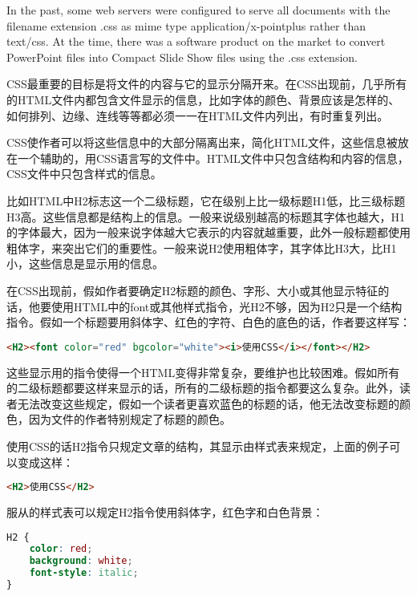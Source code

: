 In the past, some web servers were configured to serve all documents with the filename extension .css as mime type application/x-pointplus rather than text/css. At the time, there was a software product on the market to convert PowerPoint files into Compact Slide Show files using the .css extension.



CSS最重要的目标是将文件的内容与它的显示分隔开来。在CSS出现前，几乎所有的HTML文件内都包含文件显示的信息，比如字体的颜色、背景应该是怎样的、如何排列、边缘、连线等等都必须一一在HTML文件内列出，有时重复列出。

CSS使作者可以将这些信息中的大部分隔离出来，简化HTML文件，这些信息被放在一个辅助的，用CSS语言写的文件中。HTML文件中只包含结构和内容的信息，CSS文件中只包含样式的信息。

比如HTML中H2标志这一个二级标题，它在级别上比一级标题H1低，比三级标题H3高。这些信息都是结构上的信息。一般来说级别越高的标题其字体也越大，H1的字体最大，因为一般来说字体越大它表示的内容就越重要，此外一般标题都使用粗体字，来突出它们的重要性。一般来说H2使用粗体字，其字体比H3大，比H1小，这些信息是显示用的信息。


在CSS出现前，假如作者要确定H2标题的颜色、字形、大小或其他显示特征的话，他要使用HTML中的font或其他样式指令，光H2不够，因为H2只是一个结构指令。假如一个标题要用斜体字、红色的字符、白色的底色的话，作者要这样写：

\begin{lstlisting}[language=HTML]
<H2><font color="red" bgcolor="white"><i>使用CSS</i></font></H2>
\end{lstlisting}

这些显示用的指令使得一个HTML变得非常复杂，要维护也比较困难。假如所有的二级标题都要这样来显示的话，所有的二级标题的指令都要这么复杂。此外，读者无法改变这些规定，假如一个读者更喜欢蓝色的标题的话，他无法改变标题的颜色，因为文件的作者特别规定了标题的颜色。

使用CSS的话H2指令只规定文章的结构，其显示由样式表来规定，上面的例子可以变成这样：


\begin{lstlisting}[language=HTML]
<H2>使用CSS</H2>
\end{lstlisting}

服从的样式表可以规定H2指令使用斜体字，红色字和白色背景：

\begin{lstlisting}[language=CSS]
H2 { 
    color: red; 
    background: white; 
    font-style: italic; 
}
\end{lstlisting}


